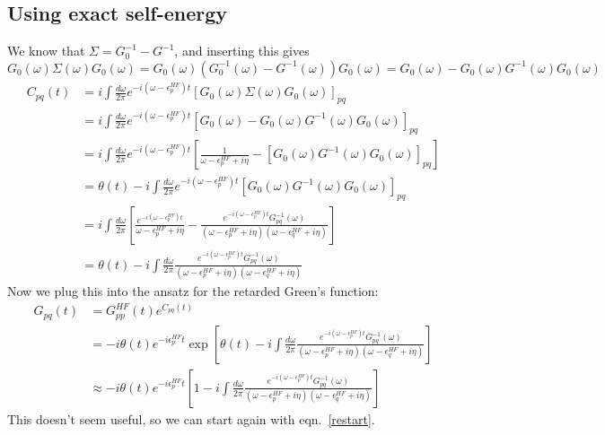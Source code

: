 \subsection{Using exact self-energy}
We know that $\Sigma = G_0^{-1} - G^{-1}$, and inserting this gives\\ $G_0(\omega) \Sigma(\omega) G_0(\omega) = G_0(\omega) \left(G_0^{-1}(\omega) - G^{-1}(\omega)\right) G_0(\omega) = G_0(\omega) - G_0(\omega) G^{-1}(\omega) G_0(\omega)$
\begin{align}
	C_{pq}(t) &= i \int \frac{d\omega}{2\pi} e^{-i(\omega-\epsilon_p^{HF})t} \left[G_0(\omega) \Sigma(\omega) G_0(\omega)\right]_{pq} \\
&= i \int \frac{d\omega}{2\pi} e^{-i(\omega-\epsilon_p^{HF})t} \left[G_0(\omega) - G_0(\omega) G^{-
1}(\omega) G_0(\omega)\right]_{pq} \\
&= i \int \frac{d\omega}{2\pi} e^{-i(\omega-\epsilon_p^{HF})t} \left[\frac{1}{\omega - \epsilon_p^{HF} + i\eta} - \left[G_0(\omega) G^{-1}(\omega) G_0(\omega)\right]_{pq}\right] \\
&= \theta(t) - i \int \frac{d\omega}{2\pi} e^{-i(\omega-\epsilon_p^{HF})t}  \left[G_0(\omega) G^{-1}(\omega) G_0(\omega)\right]_{pq}
\label{restart} \\
&= i \int \frac{d\omega}{2\pi}  \left[\frac{e^{-i(\omega-\epsilon_p^{HF})t}}{\omega - \epsilon_p^{HF} + i\eta} - \frac{e^{-i(\omega-\epsilon_p^{HF})t}G^{-1}_{pq}(\omega)}{(\omega - \epsilon_p^{HF} + i\eta)(\omega - \epsilon_q^{HF} + i\eta)}\right] \\
&= \theta  (t) - i \int \frac{d\omega}{2\pi}  \frac{e^{-i(\omega-\epsilon_p^{HF})t}G^{-1}_{pq}(\omega)}{(\omega - \epsilon_p^{HF} + i\eta)(\omega - \epsilon_q^{HF} + i\eta)} 
\end{align}
Now we plug this into the ansatz for the retarded Green's function:
\begin{align}
    G_{pq}(t) &= G_{pp}^{HF}(t) e^{C_{pq}(t)} \\
&= -i \theta(t) e^{- i \epsilon_p^{HF} t} \exp \left[\theta(t) - i \int \frac{d\omega}{2\pi}  \frac{e^{-i(\omega-\epsilon_p^{HF})t}G^{-1}_{pq}(\omega)}{(\omega - \epsilon_p^{HF} + i\eta)(\omega - \epsilon_q^{HF} + i\eta)}\right] \\
&\approx -i \theta(t) e^{- i \epsilon_p^{HF} t} \left[1 - i \int \frac{d\omega}{2\pi}  \frac{e^{-i(\omega-\epsilon_p^{HF})t}G^{-1}_{pq}(\omega)}{(\omega - \epsilon_p^{HF} + i\eta)(\omega - \epsilon_q^{HF} + i\eta)}\right] 
\end{align}
This doesn't seem useful, so we can start again with eqn.~\ref{restart}.
